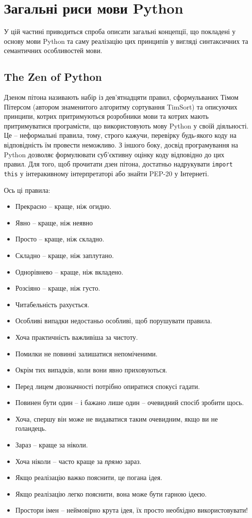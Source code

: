 \documentclass[a4paper, 12pt, onsedie]{article}
\begin{document}
\section{Загальні риси мови Python}

У цій частині приводиться спроба описати загальні концепції, що покладені у основу мови Python та саму реалізацію
цих принципів у вигляді синтаксичних та семантичних особливостей мови.

\subsection{The Zen of Python}

Дзеном пітона називають набір із дев'ятнадцяти правил, сформульваних Тімом Пітерсом (автором знаменитого алгоритму
сортування TimSort) та описуючих принципи, котрих притримуються розробники мови та котрих мають притримуватися
програмісти, що використовують мову Python у своїй діяльності. Це -- неформальні правила, тому, строго кажучи, перевірку 
будь-якого коду на відповідність їм провести неможливо. З іншого боку, досвід програмування на Python дозволяє
формулювати суб'єктивну оцінку коду відповідно до цих правил. Для того, щоб прочитати дзен пітона, достатньо надрукувати
\texttt{import this} у інтеракивному інтерпретаторі або знайти PEP-20 у Інтернеті.

Ось ці правила:
\begin{itemize}
    \item Прекрасно -- краще, ніж огидно.
    \item Явно -- краще, ніж неявно
    \item Просто -- краще, ніж складно.
    \item Складно -- краще, ніж заплутано.
    \item Однорівнево -- краще, ніж вкладено.
    \item Розсіяно -- краще, ніж густо.
    \item Читабельність рахується.
    \item Особливі випадки недостаньо особливі, щоб порушувати правила.
    \item Хоча практичність важливіша за чистоту.
    \item Помилки не повинні залишатися непоміченими.
    \item Окрім тих випадків, коли вони явно приховуються.
    \item Перед лицем двозначності потрібно опиратися спокусі гадати.
    \item Повинен бути один -- і бажано лише один -- очевидний спосіб зробити щось.
    \item Хоча, спершу він може не видаватися таким очевидним, якщо ви не голандець.
    \item Зараз -- краще за ніколи.
    \item Хоча ніколи -- часто краще за \emph{прямо} зараз.
    \item Якщо реалізацію важко пояснити, це погана ідея.
    \item Якщо реалізацію легко пояснити, вона може бути гарною ідеєю.
    \item Простори імен -- неймовірно крута ідея, їх просто необхідно використовувати!
\end{itemize}
\end{document}
